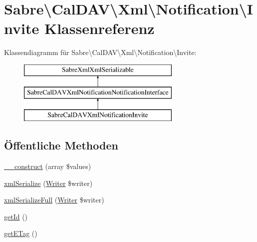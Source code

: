 \hypertarget{class_sabre_1_1_cal_d_a_v_1_1_xml_1_1_notification_1_1_invite}{}\section{Sabre\textbackslash{}Cal\+D\+AV\textbackslash{}Xml\textbackslash{}Notification\textbackslash{}Invite Klassenreferenz}
\label{class_sabre_1_1_cal_d_a_v_1_1_xml_1_1_notification_1_1_invite}
Klassendiagramm für Sabre\textbackslash{}Cal\+D\+AV\textbackslash{}Xml\textbackslash{}Notification\textbackslash{}Invite\+:\begin{figure}[H]
\begin{center}
\leavevmode
\includegraphics[height=3.000000cm]{class_sabre_1_1_cal_d_a_v_1_1_xml_1_1_notification_1_1_invite}
\end{center}
\end{figure}
\subsection*{Öffentliche Methoden}
\begin{DoxyCompactItemize}
\item 
\mbox{\hyperlink{class_sabre_1_1_cal_d_a_v_1_1_xml_1_1_notification_1_1_invite_a09f7590e77022af5d3798c625072ba63}{\+\_\+\+\_\+construct}} (array \$values)
\item 
\mbox{\hyperlink{class_sabre_1_1_cal_d_a_v_1_1_xml_1_1_notification_1_1_invite_a47eb1187c379ceed37748741294e3760}{xml\+Serialize}} (\mbox{\hyperlink{class_sabre_1_1_xml_1_1_writer}{Writer}} \$writer)
\item 
\mbox{\hyperlink{class_sabre_1_1_cal_d_a_v_1_1_xml_1_1_notification_1_1_invite_ac50ef5807224594c95d33d939e4f1bb3}{xml\+Serialize\+Full}} (\mbox{\hyperlink{class_sabre_1_1_xml_1_1_writer}{Writer}} \$writer)
\item 
\mbox{\hyperlink{class_sabre_1_1_cal_d_a_v_1_1_xml_1_1_notification_1_1_invite_a40a0865508bb7f508f3938a4ac799dc3}{get\+Id}} ()
\item 
\mbox{\hyperlink{class_sabre_1_1_cal_d_a_v_1_1_xml_1_1_notification_1_1_invite_a8d56779d8f2e8657cc7d5f1cd49af29e}{get\+E\+Tag}} ()
\end{DoxyCompactItemize}
